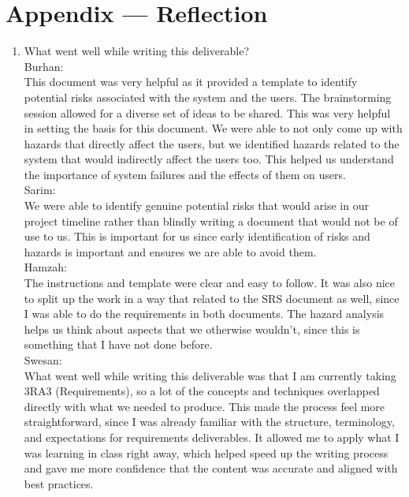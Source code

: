 \documentclass{article}
\begin{document}
\newpage{}

\section*{Appendix --- Reflection}



\begin{enumerate}
    \item What went well while writing this deliverable? \\
    
    Burhan: \\
    This document was very helpful as it provided a template to identify potential risks associated with the system and the users. The brainstorming session allowed for a diverse set of ideas to be shared. This was very helpful in setting the basis for this document. We were able to not only come up with hazards that directly affect the users, but we identified hazards related to the system that would indirectly affect the users too. This helped us understand the importance of system failures and the effects of them on users.  \\

Sarim: \\
We were able to identify genuine potential risks that would arise in our project timeline rather than blindly writing a document that would not be of use to us. This is important for us since early identification of risks and hazards is important and ensures we are able to avoid them. 
\\

Hamzah: \\
The instructions and template were clear and easy to follow. It was also nice to split up the work in a way that related to the SRS document as well, since I was able to do the requirements in both documents. The hazard analysis helps us think about aspects that we otherwise wouldn't, since this is something that I have not done before.  
\\   

Swesan: \\
What went well while writing this deliverable was that I am currently taking 3RA3 (Requirements), so a lot of the concepts and techniques overlapped directly with what we needed to produce. This made the process feel more straightforward, since I was already familiar with the structure, terminology, and expectations for requirements deliverables. It allowed me to apply what I was learning in class right away, which helped speed up the writing process and gave me more confidence that the content was accurate and aligned with best practices. 
\\
    

\end{enumerate}
\end{document}
